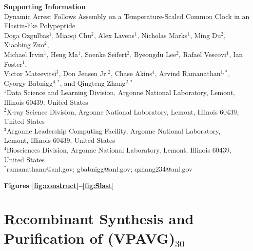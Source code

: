 \documentclass[11pt]{article}
\newcommand{\VPAVG}{(VPAVG)$_{30}$}
\begin{document}
\begin{center}
{\LARGE\bfseries Supporting Information}\\[0.5em]
{\large Dynamic Arrest Follows Assembly on a Temperature-Scaled Common Clock in an Elastin-like Polypeptide}\\[1.2em]
{\normalsize Doga Ozgulbas$^{1}$, Miaoqi Chu$^{2}$, Alex Lavens$^{1}$, Nicholas Marks$^{1}$, Ming Du$^{2}$, Xiaobing Zuo$^{2}$,\\
Michael Irvin$^{1}$, Heng Ma$^{1}$, Soenke Seifert$^{2}$, Byeongdu Lee$^{2}$, Rafael Vescovi$^{1}$, Ian Foster$^{1}$,\\
Victor Mateevitsi$^{3}$, Don Jensen Jr.$^{2}$, Chase Akins$^{4}$, Arvind Ramanathan$^{1,*}$, Gyorgy Babnigg$^{4,*}$, and Qingteng Zhang$^{2,*}$}\\[0.8em]
{\small $^{1}$Data Science and Learning Division, Argonne National Laboratory, Lemont, Illinois 60439, United States\\
$^{2}$X-ray Science Division, Argonne National Laboratory, Lemont, Illinois 60439, United States\\
$^{3}$Argonne Leadership Computing Facility, Argonne National Laboratory,\\ Lemont, Illinois 60439, United States\\
$^{4}$Biosciences Division, Argonne National Laboratory, Lemont, Illinois 60439, United States}\\[0.6em]
{\small $^{*}$ramanathana@anl.gov; gbabnigg@anl.gov; qzhang234@anl.gov}
\end{center}

\setcounter{tocdepth}{2}
\renewcommand{\contentsname}{Supporting Information Contents}
\tableofcontents
\vspace{1.6em}
\noindent\textbf{Figures \ref{fig:construct}--\ref{fig:Slast}}

\section{Recombinant Synthesis and Purification of \texorpdfstring{\VPAVG}{(VPAVG)30}}
\label{sec:synthesis}
\end{document}
